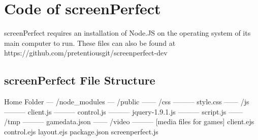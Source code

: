 
\chapter{Code of screenPerfect} %

\label{AppendixACode} %


screenPerfect requires an installation of Node.JS on the operating system of its main computer to run.
These files can also be found at https://github.com/pretentiousgit/screenperfect-dev

\section{screenPerfect File Structure}
Home Folder
--- /node_modules
--- /public
------ /css
--------- style.css
------ /js
--------- client.js
--------- control.js
--------- jquery-1.9.1.js
--------- script.js
------ /tmp
--------- gamedata.json
------ /video
--------- [media files for games]
client.ejs
control.ejs
layout.ejs
package.json
screenperfect.js


